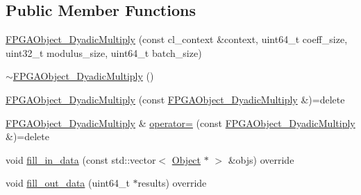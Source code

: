 \subsection*{Public Member Functions}
\begin{DoxyCompactItemize}
\item 
\hyperlink{structintel_1_1hexl_1_1fpga_1_1FPGAObject__DyadicMultiply_a2246da0a69a18053fe76d8d5b07a3b14}{F\-P\-G\-A\-Object\-\_\-\-Dyadic\-Multiply} (const cl\-\_\-context \&context, uint64\-\_\-t coeff\-\_\-size, uint32\-\_\-t modulus\-\_\-size, uint64\-\_\-t batch\-\_\-size)
\item 
\hyperlink{structintel_1_1hexl_1_1fpga_1_1FPGAObject__DyadicMultiply_adba71553a77b8e2dea74e6c33fde39f5}{$\sim$\-F\-P\-G\-A\-Object\-\_\-\-Dyadic\-Multiply} ()
\item 
\hyperlink{structintel_1_1hexl_1_1fpga_1_1FPGAObject__DyadicMultiply_ab107ff5c684b94d5416d184f6e308f9b}{F\-P\-G\-A\-Object\-\_\-\-Dyadic\-Multiply} (const \hyperlink{structintel_1_1hexl_1_1fpga_1_1FPGAObject__DyadicMultiply}{F\-P\-G\-A\-Object\-\_\-\-Dyadic\-Multiply} \&)=delete
\item 
\hyperlink{structintel_1_1hexl_1_1fpga_1_1FPGAObject__DyadicMultiply}{F\-P\-G\-A\-Object\-\_\-\-Dyadic\-Multiply} \& \hyperlink{structintel_1_1hexl_1_1fpga_1_1FPGAObject__DyadicMultiply_a1be9ab40f69d59dd1c12e9f2ef41b334}{operator=} (const \hyperlink{structintel_1_1hexl_1_1fpga_1_1FPGAObject__DyadicMultiply}{F\-P\-G\-A\-Object\-\_\-\-Dyadic\-Multiply} \&)=delete
\item 
void \hyperlink{structintel_1_1hexl_1_1fpga_1_1FPGAObject__DyadicMultiply_aa4f825403efabeffbf3c9eee6cf0ecb1}{fill\-\_\-in\-\_\-data} (const std\-::vector$<$ \hyperlink{structintel_1_1hexl_1_1fpga_1_1Object}{Object} $\ast$ $>$ \&objs) override
\item 
void \hyperlink{structintel_1_1hexl_1_1fpga_1_1FPGAObject__DyadicMultiply_a2a95c53a7a8bcca57da535a5ad6e7692}{fill\-\_\-out\-\_\-data} (uint64\-\_\-t $\ast$results) override
\end{DoxyCompactItemize}
